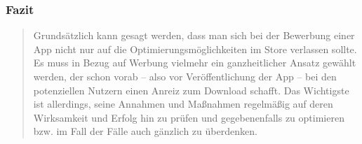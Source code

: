 \documentclass[FIPLY_base.tex]{subfiles}
\begin{document}
\subsubsection{Fazit}
\begin{quote}Grundsätzlich kann gesagt werden, dass man sich bei der Bewerbung einer App nicht nur auf die Optimierungsmöglichkeiten im Store verlassen sollte. Es muss in Bezug auf Werbung vielmehr ein ganzheitlicher Ansatz gewählt werden, der schon vorab – also vor Veröffentlichung der App – bei den potenziellen Nutzern einen Anreiz zum Download schafft. Das Wichtigste ist allerdings, seine Annahmen und Maßnahmen regelmäßig auf deren Wirksamkeit und Erfolg hin zu prüfen und gegebenenfalls zu optimieren bzw. im Fall der Fälle auch gänzlich zu überdenken.\end{quote}
\end{document}
